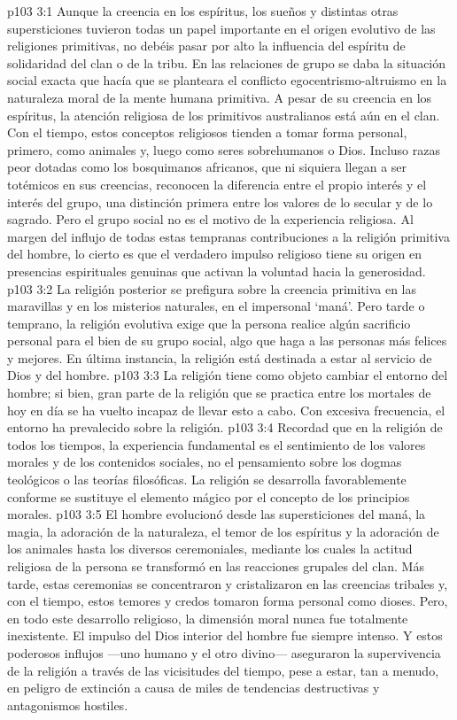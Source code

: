 \vs p103 3:1 Aunque la creencia en los espíritus, los sueños y distintas otras supersticiones tuvieron todas un papel importante en el origen evolutivo de las religiones primitivas, no debéis pasar por alto la influencia del espíritu de solidaridad del clan o de la tribu. En las relaciones de grupo se daba la situación social exacta que hacía que se planteara el conflicto egocentrismo\hyp{}altruismo en la naturaleza moral de la mente humana primitiva. A pesar de su creencia en los espíritus, la atención religiosa de los primitivos australianos está aún en el clan. Con el tiempo, estos conceptos religiosos tienden a tomar forma personal, primero, como animales y, luego como seres sobrehumanos o Dios. Incluso razas peor dotadas como los bosquimanos africanos, que ni siquiera llegan a ser totémicos en sus creencias, reconocen la diferencia entre el propio interés y el interés del grupo, una distinción primera entre los valores de lo secular y de lo sagrado. Pero el grupo social no es el motivo de la experiencia religiosa. Al margen del influjo de todas estas tempranas contribuciones a la religión primitiva del hombre, lo cierto es que el verdadero impulso religioso tiene su origen en presencias espirituales genuinas que activan la voluntad hacia la generosidad.
\vs p103 3:2 \pc La religión posterior se prefigura sobre la creencia primitiva en las maravillas y en los misterios naturales, en el impersonal ‘maná’. Pero tarde o temprano, la religión evolutiva exige que la persona realice algún sacrificio personal para el bien de su grupo social, algo que haga a las personas más felices y mejores. En última instancia, la religión está destinada a estar al servicio de Dios y del hombre.
\vs p103 3:3 La religión tiene como objeto cambiar el entorno del hombre; si bien, gran parte de la religión que se practica entre los mortales de hoy en día se ha vuelto incapaz de llevar esto a cabo. Con excesiva frecuencia, el entorno ha prevalecido sobre la religión.
\vs p103 3:4 \pc Recordad que en la religión de todos los tiempos, la experiencia fundamental es el sentimiento de los valores morales y de los contenidos sociales, no el pensamiento sobre los dogmas teológicos o las teorías filosóficas. La religión se desarrolla favorablemente conforme se sustituye el elemento mágico por el concepto de los principios morales.
\vs p103 3:5 El hombre evolucionó desde las supersticiones del maná, la magia, la adoración de la naturaleza, el temor de los espíritus y la adoración de los animales hasta los diversos ceremoniales, mediante los cuales la actitud religiosa de la persona se transformó en las reacciones grupales del clan. Más tarde, estas ceremonias se concentraron y cristalizaron en las creencias tribales y, con el tiempo, estos temores y credos tomaron forma personal como dioses. Pero, en todo este desarrollo religioso, la dimensión moral nunca fue totalmente inexistente. El impulso del Dios interior del hombre fue siempre intenso. Y estos poderosos influjos ---uno humano y el otro divino--- aseguraron la supervivencia de la religión a través de las vicisitudes del tiempo, pese a estar, tan a menudo, en peligro de extinción a causa de miles de tendencias destructivas y antagonismos hostiles.
